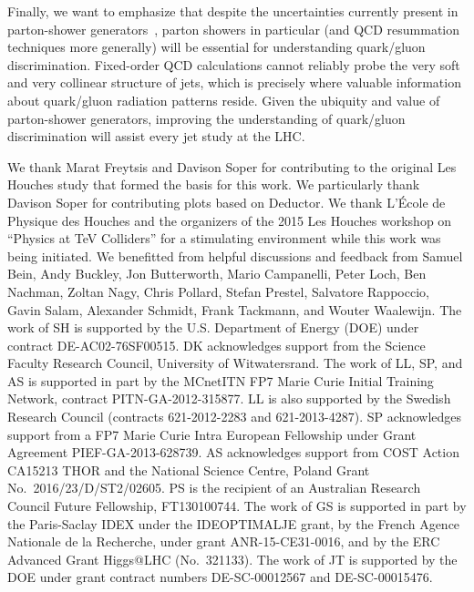 \documentclass[11pt,letterpaper]{article}
\begin{document}
Finally, we want to emphasize that despite the uncertainties currently present in parton-shower generators~\cite{Bellm:2016rhh,Bellm:2016voq,Mrenna:2016sih,Bothmann:2016nao}, 
parton showers in particular (and QCD resummation techniques more generally) will be essential for understanding quark/gluon discrimination.  Fixed-order QCD calculations cannot reliably probe the very soft and very collinear structure of jets, which is precisely where valuable information about quark/gluon radiation patterns reside.  Given the ubiquity and value of parton-shower generators, improving the understanding of quark/gluon discrimination will assist every jet study at the LHC.

\begin{acknowledgments}

We thank Marat Freytsis and Davison Soper for contributing to the original Les Houches study \cite{Badger:2016bpw} that formed the basis for this work.  We particularly thank Davison Soper for contributing plots based on Deductor.
%
We thank L'\'{E}cole de Physique des Houches and the organizers of the 2015 Les Houches workshop on ``Physics at TeV Colliders'' for a stimulating environment while this work was being initiated.
%
We benefitted from helpful discussions and feedback from Samuel Bein, Andy Buckley, Jon Butterworth, Mario Campanelli, Peter Loch, Ben Nachman, Zoltan Nagy, Chris Pollard, Stefan Prestel, Salvatore Rappoccio, Gavin Salam, Alexander Schmidt, Frank Tackmann, and Wouter Waalewijn.
%
The work of SH is supported by the U.S. Department of Energy (DOE) under contract DE-AC02-76SF00515.
%
DK acknowledges support from the Science Faculty Research Council, University of Witwatersrand.
%
The work of LL, SP, and AS is supported in part by the MCnetITN FP7 Marie Curie Initial Training Network, contract PITN-GA-2012-315877.
%
LL is also supported by the Swedish Research Council (contracts 621-2012-2283 and 621-2013-4287).
%
SP acknowledges support from a FP7 Marie Curie Intra European Fellowship under Grant Agreement PIEF-GA-2013-628739.
%
AS acknowledges support from COST Action CA15213 THOR and the National Science Centre, Poland Grant No.~2016/23/D/ST2/02605.
%
PS is the recipient of an Australian Research Council Future Fellowship, FT130100744.
% 
The work of GS is supported in part by the Paris-Saclay IDEX under the
IDEOPTIMALJE grant, by the French Agence Nationale de la Recherche,
under grant ANR-15-CE31-0016, and by the ERC Advanced Grant Higgs@LHC
(No.\ 321133).
%
The work of JT is supported by the DOE under grant contract numbers DE-SC-00012567 and DE-SC-00015476.

\end{acknowledgments}



\end{document}
